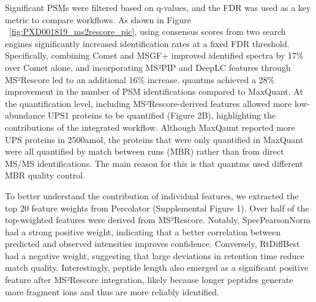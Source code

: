 \documentclass[12pt]{article}
\begin{document}
Significant PSMs were filtered based on q-values, and the FDR was used as a key metric to compare workflows. %
As shown in Figure ~\ref{fig:PXD001819_ms2rescore_pic}, using consensus scores from two search engines significantly increased identification rates at a fixed FDR threshold. Specifically, combining Comet and MSGF+ improved identified spectra by 17\% over Comet alone, and incorporating MS²PIP and DeepLC features through MS²Rescore led to an additional 16\% increase. quantms achieved a 28\% improvement in the number of PSM identifications compared to MaxQuant. At the quantification level, including MS²Rescore-derived features allowed more low-abundance UPS1 proteins to be quantified (Figure 2B), highlighting the contributions of the integrated workflow. Although MaxQaunt reported more UPS proteins in 2500amol, the proteins that were only quantified in MaxQuant were all quantified by match between runs (MBR) rather than from direct MS/MS identifications. The main reason for this is that quantms used different MBR quality control. %

To better understand the contribution of individual features, we extracted the top 20 feature weights from Percolator (Supplemental Figure 1). Over half of the top-weighted features were derived from MS²Rescore. Notably, SpecPearsonNorm had a strong positive weight, indicating that a better correlation between predicted and observed intensities improves confidence. Conversely, RtDiffBest had a negative weight, suggesting that large deviations in retention time reduce match quality. Interestingly, peptide length also emerged as a significant positive feature after MS²Rescore integration, likely because longer peptides generate more fragment ions and thus are more reliably identified. %
\end{document}
